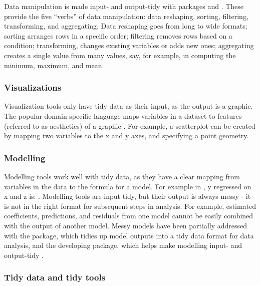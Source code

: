 \documentclass[
]{jss}
\begin{document}
Data manipulation is made input- and output-tidy with  packages  and  \citep{dplyr, tidyr}. These provide the five ``verbs'' of data manipulation: data reshaping, sorting, filtering, transforming, and aggregating. Data reshaping goes from long to wide formats; sorting arranges rows in a specific order; filtering removes rows based on a condition; transforming, changes existing variables or adds new ones; aggregating creates a single value from many values, say, for example, in computing the minimum, maximum, and mean.

\hypertarget{tidy-vis}{%
\subsubsection{Visualizations}\label{tidy-vis}}

Visualization tools only have tidy data as their input, as the output is a graphic. The popular domain specific language  maps variables in a dataset to features (referred to as aesthetics) of a graphic \citep{ggplot2}. For example, a scatterplot can be created by mapping two variables to the x and y axes, and specifying a point geometry.

\hypertarget{tidy-model}{%
\subsubsection{Modelling}\label{tidy-model}}

Modelling tools work well with tidy data, as they have a clear mapping from variables in the data to the formula for a model. For example in , y regressed on x and z is: . Modelling tools are input tidy, but their output is always messy - it is not in the right format for subsequent steps in analysis. For example, estimated coefficients, predictions, and residuals from one model cannot be easily combined with the output of another model. Messy models have been partially addressed with the  package, which tidies up model outputs into a tidy data format for data analysis, and the developing  package, which helps make modelling input- and output-tidy \citep{recipes}.

\hypertarget{the-tidyverse}{%
\subsubsection{Tidy data and tidy tools}\label{the-tidyverse}}
\end{document}
